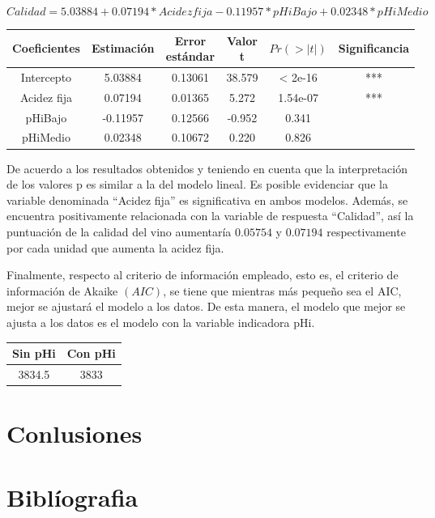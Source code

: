 \documentclass[
]{article}
\begin{document}
\[Calidad=5.03884+0.07194*Acidezfija-0.11957*pHiBajo+0.02348*pHiMedio\]

\begin{longtable}[]{@{}cccccc@{}}
\toprule
Coeficientes & Estimación & Error estándar & Valor t & \(Pr(>|t|)\) &
Significancia\tabularnewline
\midrule
\endhead
Intercepto & 5.03884 & 0.13061 & 38.579 & \textless{} 2e-16 &
***\tabularnewline
Acidez fija & 0.07194 & 0.01365 & 5.272 & 1.54e-07 & ***\tabularnewline
pHiBajo & -0.11957 & 0.12566 & -0.952 & 0.341 &\tabularnewline
pHiMedio & 0.02348 & 0.10672 & 0.220 & 0.826 &\tabularnewline
\bottomrule
\end{longtable}

De acuerdo a los resultados obtenidos y teniendo en cuenta que la
interpretación de los valores p es similar a la del modelo lineal. Es
posible evidenciar que la variable denominada ``Acidez fija'' es
significativa en ambos modelos. Además, se encuentra positivamente
relacionada con la variable de respuesta ``Calidad'', así la puntuación
de la calidad del vino aumentaría \(0.05754\) y \(0.07194\)
respectivamente por cada unidad que aumenta la acidez fija.

Finalmente, respecto al criterio de información empleado, esto es, el
criterio de información de Akaike \((AIC)\), se tiene que mientras más
pequeño sea el AIC, mejor se ajustará el modelo a los datos. De esta
manera, el modelo que mejor se ajusta a los datos es el modelo con la
variable indicadora pHi.

\begin{longtable}[]{@{}cc@{}}
\toprule
Sin pHi & Con pHi\tabularnewline
\midrule
\endhead
3834.5 & 3833\tabularnewline
\bottomrule
\end{longtable}

\hypertarget{conlusiones}{%
\section{Conlusiones}\label{conlusiones}}

\hypertarget{bibluxedografia}{%
\section{Biblíografia}\label{bibluxedografia}}
\end{document}
